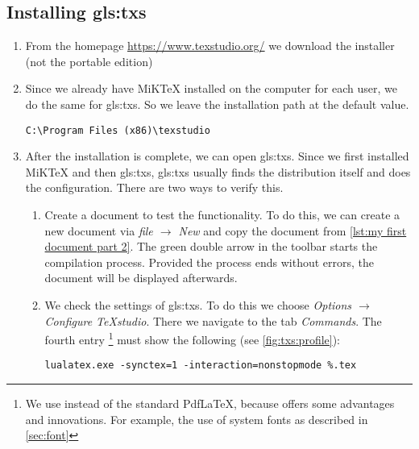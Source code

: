 \subsection{Installing \gls*{gls:txs}}
\label{sec:txs}
\begin{enumerate}
	\item From the homepage \url{https://www.texstudio.org/} we download the installer (not the portable edition)
	\item Since we already have MiKTeX installed on the computer for each user, we do the same for \gls{gls:txs}. So we leave the installation path at the default value.
	\begin{lstlisting}[caption=Installation path for \gls{gls:txs}]
		C:\Program Files (x86)\texstudio
	\end{lstlisting}
	\item After the installation is complete, we can open \gls{gls:txs}. Since we first installed MiKTeX and then \gls{gls:txs}, \gls{gls:txs} usually finds the distribution itself and does the configuration. There are two ways to verify this.
	\begin{enumerate}
		\item Create a document to test the functionality. To do this, we can create a new document via \textit{file $\rightarrow$ New} and copy the document from \autoref{lst:my first document part 2}. The green double arrow in the toolbar starts the compilation process. Provided the process ends without errors, the document will be displayed afterwards.
		\item We check the settings of \gls{gls:txs}. To do this we choose \textit{Options $\rightarrow$ Configure TeXstudio}. There we navigate to the tab \textit{Commands}. The fourth entry \LuaLaTeX\footnote{We use {\LuaLaTeX} instead of the standard Pdf\LaTeX, because {\LuaLaTeX} offers some advantages and innovations. For example, the use of system fonts as described in \autoref{sec:font}} must show the following (see \autoref{fig:txs:profile}):
		
		\begin{minipage}{\linewidth}
			\begin{lstlisting}[language=none, caption={[Settings for \gls{gls:txs} -- {\LuaLaTeX} Process]Settings for the use of \texttt{lualatex.exe} in \gls{gls:txs}, located at \textit{Options $\rightarrow$ Configure TeXstudio $\rightarrow$ Commands}. \label{lst:editor:txs:lualatex}}]
			lualatex.exe -synctex=1 -interaction=nonstopmode %.tex
			\end{lstlisting}
		\end{minipage}%
		

\end{enumerate}
\end{enumerate}
